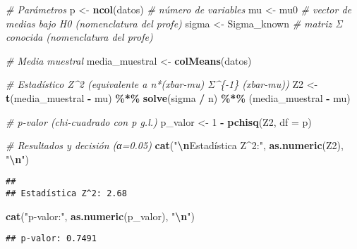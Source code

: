 \documentclass[
]{article}
\newenvironment{Shaded}{\begin{snugshade}}{\end{snugshade}}
\newcommand{\AttributeTok}[1]{\textcolor[rgb]{0.13,0.29,0.53}{#1}}
\newcommand{\CommentTok}[1]{\textcolor[rgb]{0.56,0.35,0.01}{\textit{#1}}}
\newcommand{\DecValTok}[1]{\textcolor[rgb]{0.00,0.00,0.81}{#1}}
\newcommand{\FunctionTok}[1]{\textcolor[rgb]{0.13,0.29,0.53}{\textbf{#1}}}
\newcommand{\NormalTok}[1]{#1}
\newcommand{\OtherTok}[1]{\textcolor[rgb]{0.56,0.35,0.01}{#1}}
\newcommand{\SpecialCharTok}[1]{\textcolor[rgb]{0.81,0.36,0.00}{\textbf{#1}}}
\newcommand{\StringTok}[1]{\textcolor[rgb]{0.31,0.60,0.02}{#1}}
\begin{document}
\begin{Shaded}
\begin{Highlighting}[]
\CommentTok{\# Parámetros}
\NormalTok{p }\OtherTok{\textless{}{-}} \FunctionTok{ncol}\NormalTok{(datos)                       }\CommentTok{\# número de variables}
\NormalTok{mu }\OtherTok{\textless{}{-}}\NormalTok{ mu0                              }\CommentTok{\# vector de medias bajo H0 (nomenclatura del profe)}
\NormalTok{sigma }\OtherTok{\textless{}{-}}\NormalTok{ Sigma\_known                   }\CommentTok{\# matriz Σ conocida (nomenclatura del profe)}

\CommentTok{\# Media muestral}
\NormalTok{media\_muestral }\OtherTok{\textless{}{-}} \FunctionTok{colMeans}\NormalTok{(datos)}

\CommentTok{\# Estadístico Z\^{}2 (equivalente a n*(xbar{-}mu)\textquotesingle{} Σ\^{}\{{-}1\} (xbar{-}mu))}
\NormalTok{Z2 }\OtherTok{\textless{}{-}} \FunctionTok{t}\NormalTok{(media\_muestral }\SpecialCharTok{{-}}\NormalTok{ mu) }\SpecialCharTok{\%*\%} \FunctionTok{solve}\NormalTok{(sigma }\SpecialCharTok{/}\NormalTok{ n) }\SpecialCharTok{\%*\%}\NormalTok{ (media\_muestral }\SpecialCharTok{{-}}\NormalTok{ mu)}

\CommentTok{\# p{-}valor (chi{-}cuadrado con p g.l.)}
\NormalTok{p\_valor }\OtherTok{\textless{}{-}} \DecValTok{1} \SpecialCharTok{{-}} \FunctionTok{pchisq}\NormalTok{(Z2, }\AttributeTok{df =}\NormalTok{ p)}

\CommentTok{\# Resultados y decisión (α=0.05)}
\FunctionTok{cat}\NormalTok{(}\StringTok{"}\SpecialCharTok{\textbackslash{}n}\StringTok{Estadística Z\^{}2:"}\NormalTok{, }\FunctionTok{as.numeric}\NormalTok{(Z2), }\StringTok{"}\SpecialCharTok{\textbackslash{}n}\StringTok{"}\NormalTok{)}
\end{Highlighting}
\end{Shaded}

\begin{verbatim}
## 
## Estadística Z^2: 2.68
\end{verbatim}

\begin{Shaded}
\begin{Highlighting}[]
\FunctionTok{cat}\NormalTok{(}\StringTok{"p{-}valor:"}\NormalTok{, }\FunctionTok{as.numeric}\NormalTok{(p\_valor), }\StringTok{"}\SpecialCharTok{\textbackslash{}n}\StringTok{"}\NormalTok{)}
\end{Highlighting}
\end{Shaded}

\begin{verbatim}
## p-valor: 0.7491
\end{verbatim}
\end{document}
